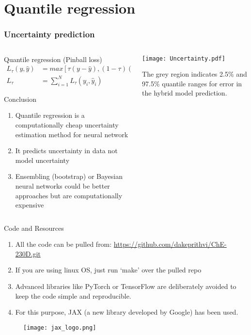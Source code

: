 \documentclass[dvipsnames, 9pt]{beamer}
\begin{document}
\section{Quantile regression}
\begin{frame}
    \frametitle{Uncertainty prediction}
    
    \begin{columns}
    {   \begin{column}{0.5\textwidth}
        \begin{block}{Quantile regression (Pinball loss)}
        \begin{align*}
        L_{\tau}(y,\hat{y}) &= max[\tau (y - \hat{y}), (1  - \tau) (\hat{y} - y)] \\
        L_{\tau} &= \sum_{i=1}^N L_{\tau} (y_i,\hat{y}_i)
        \end{align*}
        \end{block}
        \begin{block}{Conclusion}
        \begin{enumerate}
        \item Quantile regression is a computationally cheap uncertainty estimation method for neural network
        \item It predicts uncertainty in data not model uncertainty
        \item Ensembling (bootstrap) or Bayesian neural networks could be better approaches but are computationally expensive
        \end{enumerate}
        \end{block}
        \end{column}}
        \begin{column}{0.5\textwidth}
        \texttt{[image: Uncertainty.pdf]}
        \begin{center}
        \scriptsize{The grey region indicates 2.5\% and 97.5\% quantile ranges for error in the hybrid model prediction.}
        \end{center}
        \end{column}
    \end{columns}
\end{frame}


\begin{frame}{Code and Resources}
\begin{enumerate}
\item All the code can be pulled from: \url{https://github.com/dakeprithvi/ChE-230D.git}
\item If you are using linux OS, just run `make' over the pulled repo
\item Advanced libraries like PyTorch or TensorFlow are deliberately avoided to keep the code simple and reproducible.
\item For this purpose, JAX (a new library developed by Google) has been used. 
\end{enumerate}
\begin{figure}[H]
\centering
\texttt{[image: jax\_logo.png]}
\end{figure}
\end{frame}
\end{document}
